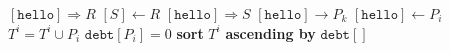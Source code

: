 \documentclass{article}
\begin{document}
\pagestyle{empty}

\newcommand{\send}{\Rightarrow}
\newcommand{\sendto}{\rightarrow}
\algrenewcommand{}

\begin{algorithmic}
  \State $[\mathtt{hello}] \send R$
  \State $[S] \gets R$
  \State $[\mathtt{hello}] \send S$
  \State $[\mathtt{hello}]\sendto P_k$
  \EndFor
  \EndProcedure
  \newline
  \State $[\mathtt{hello}] \gets P_i$
  \State $T^i = T^i \cup P_i$
  \State $\mathtt{debt}[P_i]=0$
  \State \textbf{sort} $T^i$ \textbf{ascending by} $\mathtt{debt[]}$
  \EndWhile
  \EndProcedure
  
\end{algorithmic}
\end{document}
